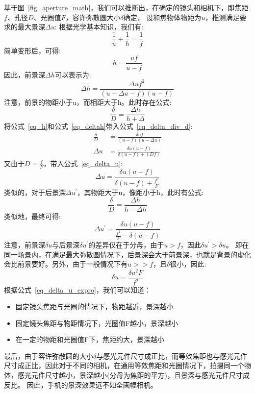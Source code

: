 \documentclass{ctexart}
\begin{document}
基于图~\ref{fig_aperture_math}，我们可以推断出，在确定的镜头和相机下，即焦距$f$、孔径$D$、光圈值$F$，容许弥散圆大小$\delta$确定，
设和焦物体物距为$u$，推测满足要求的最大景深$\Delta u$:
根据光学基本知识，我们有:
\begin{equation}
    \frac{1}{u}+\frac{1}{h} = \frac{1}{f}
\label{eq_fuh}
\end{equation}
简单变形后，可得:
\begin{equation}
    h = \frac{uf}{u-f}
    \label{eq_h}
\end{equation}
因此，前景深$\Delta h$可以表示为:
\begin{equation}
    \Delta h = \frac{\Delta u f^2}{(u-\Delta u -f)(u-f)}
    \label{eq_deltah}
\end{equation}
注意，前景的物距小于u，而相距大于h。此时存在公式:
\begin{equation}
    \frac{\delta}{D} = \frac{\Delta h}{h+\Delta}
    \label{eq_delta_div_d}
\end{equation}
将公式~\ref{eq_h}和公式~\ref{eq_deltah}带入公式~\ref{eq_delta_div_d}:
\begin{align}
    \frac{\delta}{D} &= \frac{\delta uf}{(u-f)(u-\Delta u)} \\
    \Delta u &= \frac{\delta u(u-f)}{\delta(u-f)+(Df)}
    \label{eq_delta_u}
\end{align}
又由于$D=\frac{f}{F}$，带入公式~\ref{eq_delta_u}:
\begin{equation}
    \Delta u = \frac{\delta u(u-f)}{\delta(u-f)+\frac{f^2}{F}}
\end{equation}
类似的，对于后景深$\Delta u^{'}$，其物距大于u，像距小于h，此时有公式:
\begin{equation}
    \frac{\delta}{D} = \frac{\Delta h}{h-\Delta h}
\end{equation}
类似地，最终可得:
\begin{equation}
    \Delta u^{'} = \frac{\delta u(u-f)}{\frac{f^2}{F}-\delta(u-f)}
\end{equation}
注意，前景深$\delta u$与后景深$\delta u^{'}$的差异仅在于分母，由于$u>f$，因此$\delta u^{'}>\delta u$。
即在同一场景内，在满足最大弥散圆情况下，后景深会大于前景深，也就是背景的虚化会比前景要好。另外，由于一般情况下有$u>>f$，且$\delta$很小，因此:
\begin{equation}
    \delta u = \frac{\delta u^{2}F}{f^{2}}
    \label{eq_delta_u_expro}
\end{equation}
根据公式~\ref{eq_delta_u_expro}，我们可以知道：
\begin{itemize}
    \item 固定镜头焦距与光圈的情况下，物距越近，景深越小
    \item 固定镜头焦距与物距情况下，光圈值F越小，景深越小
    \item 在一定的物距和光圈值F下，焦距约大，景深越小
\end{itemize}
最后，由于容许弥散圆的大小$\delta$与感光元件尺寸成正比，而等效焦距也与感光元件尺寸成正比，因此对于不同的相机，在通用等效焦距和光圈情况下，拍摄同一个物体，感光元件尺寸越小，景深越小(分母为焦距的平方)，且景深与感光元件尺寸成反比。
因此，手机的景深效果远不如全画幅相机。
\end{document}
